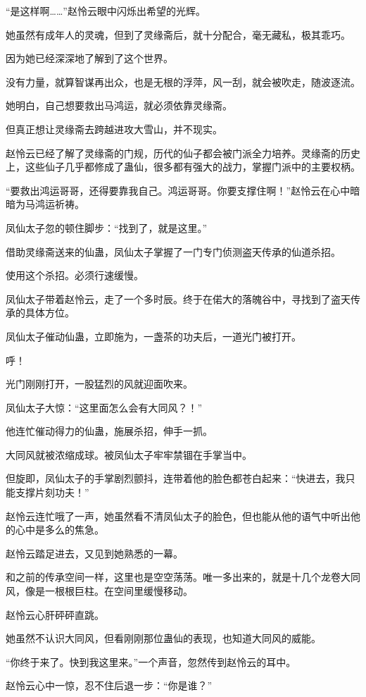 \begin{this_body}
“是这样啊……”赵怜云眼中闪烁出希望的光辉。

她虽然有成年人的灵魂，但到了灵缘斋后，就十分配合，毫无藏私，极其乖巧。

因为她已经深深地了解到了这个世界。

没有力量，就算智谋再出众，也是无根的浮萍，风一刮，就会被吹走，随波逐流。

她明白，自己想要救出马鸿运，就必须依靠灵缘斋。

但真正想让灵缘斋去跨越进攻大雪山，并不现实。

赵怜云已经了解了灵缘斋的门规，历代的仙子都会被门派全力培养。灵缘斋的历史上，这些仙子几乎都修成了蛊仙，很多都有强大的战力，掌握门派中的主要权柄。

“要救出鸿运哥哥，还得要靠我自己。鸿运哥哥。你要支撑住啊！”赵怜云在心中暗暗为马鸿运祈祷。

凤仙太子忽的顿住脚步：“找到了，就是这里。”

借助灵缘斋送来的仙蛊，凤仙太子掌握了一门专门侦测盗天传承的仙道杀招。

使用这个杀招。必须行速缓慢。

凤仙太子带着赵怜云，走了一个多时辰。终于在偌大的落魄谷中，寻找到了盗天传承的具体方位。

凤仙太子催动仙蛊，立即施为，一盏茶的功夫后，一道光门被打开。

呼！

光门刚刚打开，一股猛烈的风就迎面吹来。

凤仙太子大惊：“这里面怎么会有大同风？！”

他连忙催动得力的仙蛊，施展杀招，伸手一抓。

大同风就被浓缩成球。被凤仙太子牢牢禁锢在手掌当中。

但旋即，凤仙太子的手掌剧烈颤抖，连带着他的脸色都苍白起来：“快进去，我只能支撑片刻功夫！”

赵怜云连忙哦了一声，她虽然看不清凤仙太子的脸色，但也能从他的语气中听出他的心中是多么的焦急。

赵怜云踏足进去，又见到她熟悉的一幕。

和之前的传承空间一样，这里也是空空荡荡。唯一多出来的，就是十几个龙卷大同风，像是一根根巨柱。在空间里缓慢移动。

赵怜云心肝砰砰直跳。

她虽然不认识大同风，但看刚刚那位蛊仙的表现，也知道大同风的威能。

“你终于来了。快到我这里来。”一个声音，忽然传到赵怜云的耳中。

赵怜云心中一惊，忍不住后退一步：“你是谁？”


\end{this_body}
